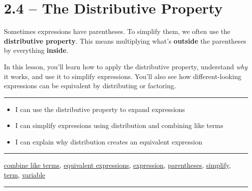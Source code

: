 \documentclass[
  letterpaper,
  DIV=11,
  numbers=noendperiod]{scrreprt}
\providecommand{\tightlist}{%
  \setlength{\itemsep}{0pt}\setlength{\parskip}{0pt}}
\begin{document}
\chapter*{2.4 -- The Distributive
Property}\label{the-distributive-property}


Sometimes expressions have parentheses. To simplify them, we often use
the \textbf{distributive property}. This means multiplying what's
\textbf{outside} the parentheses by everything \textbf{inside}.

In this lesson, you'll learn how to apply the distributive property,
understand \emph{why} it works, and use it to simplify expressions.
You'll also see how different-looking expressions can be equivalent by
distributing or factoring.

\begin{center}\rule{0.5\linewidth}{0.5pt}\end{center}

\begin{itemize}
\tightlist
\item
  I can use the distributive property to expand expressions\\
\item
  I can simplify expressions using distribution and combining like
  terms\\
\item
  I can explain why distribution creates an equivalent expression\\
\end{itemize}

\begin{center}\rule{0.5\linewidth}{0.5pt}\end{center}

\href{./glossary.html\#glossary-combine-like-term}{combine like terms},
\href{./glossary.html\#glossary-equivalent-expression}{equivalent expressions},
\href{./glossary.html\#glossary-expression}{expression},
\href{./glossary.html\#glossary-parentheses}{parentheses},
\href{./glossary.html\#glossary-simplify}{simplify},
\href{./glossary.html\#glossary-term}{term},
\href{./glossary.html\#glossary-variable}{variable}

\begin{center}\rule{0.5\linewidth}{0.5pt}\end{center}
\end{document}
